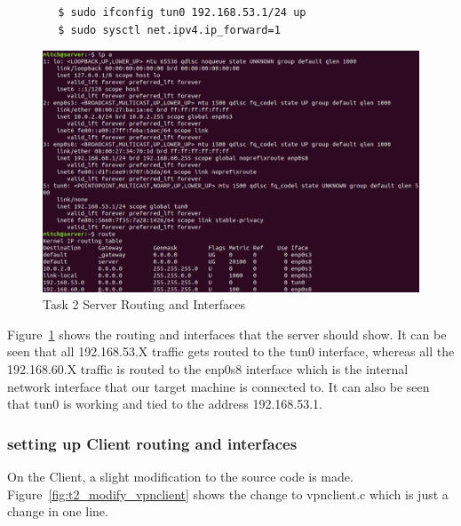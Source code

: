 \documentclass[12pt]{article}
\begin{document}
    \begin{verbatim}
        $ sudo ifconfig tun0 192.168.53.1/24 up
        $ sudo sysctl net.ipv4.ip_forward=1
    \end{verbatim}
    
    \begin{figure}[H]
        \begin{center}
            \includegraphics[scale=0.45]{t2_server_routing.png}
        \end{center}{}
        \caption{Task 2 Server Routing and Interfaces}
        \label{fig:t2_server_routing}
    \end{figure}

    Figure~\ref{fig:t2_server_routing} shows the routing and interfaces that the server should show. It can be seen that all 192.168.53.X traffic gets routed to the tun0 interface, whereas all the 192.168.60.X traffic is routed to the enp0s8 interface which is the internal network interface that our target machine is connected to. It can also be seen that tun0 is working and tied to the address 192.168.53.1.

\subsubsection{setting up Client routing and interfaces}
    On the Client, a slight modification to the source code is made. Figure~\ref{fig:t2_modify_vpnclient} shows the change to vpnclient.c which is just a change in one line.
    
\end{document}
